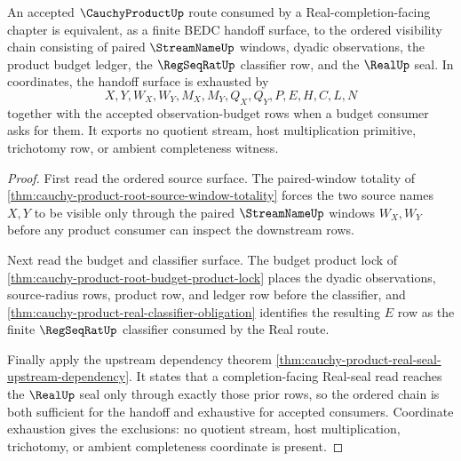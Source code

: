 \begin{theorem}
\label{thm:real-regseqrat-streamname-cauchyproduct-handoff}
An accepted $\CauchyProductUp$ route consumed by a Real-completion-facing chapter is equivalent, as a finite BEDC handoff surface, to the ordered visibility chain consisting of paired $\StreamNameUp$ windows, dyadic observations, the product budget ledger, the $\RegSeqRatUp$ classifier row, and the $\RealUp$ seal. In coordinates, the handoff surface is exhausted by
$$
X,Y,W_X,W_Y,M_X,M_Y,Q_X,Q_Y,P,E,H,C,L,N
$$
together with the accepted observation-budget rows when a budget consumer asks for them. It exports no quotient stream, host multiplication primitive, trichotomy row, or ambient completeness witness.
\end{theorem}
\begin{proof}
First read the ordered source surface. The paired-window totality of \autoref{thm:cauchy-product-root-source-window-totality} forces the two source names $X,Y$ to be visible only through the paired $\StreamNameUp$ windows $W_X,W_Y$ before any product consumer can inspect the downstream rows.

Next read the budget and classifier surface. The budget product lock of \autoref{thm:cauchy-product-root-budget-product-lock} places the dyadic observations, source-radius rows, product row, and ledger row before the classifier, and \autoref{thm:cauchy-product-real-classifier-obligation} identifies the resulting $E$ row as the finite $\RegSeqRatUp$ classifier consumed by the Real route.

Finally apply the upstream dependency theorem \autoref{thm:cauchy-product-real-seal-upstream-dependency}. It states that a completion-facing Real-seal read reaches the $\RealUp$ seal only through exactly those prior rows, so the ordered chain is both sufficient for the handoff and exhaustive for accepted consumers. Coordinate exhaustion gives the exclusions: no quotient stream, host multiplication, trichotomy, or ambient completeness coordinate is present.
\end{proof}

